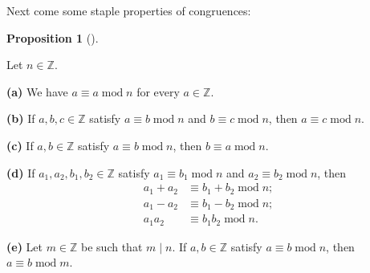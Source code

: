 \documentclass[numbers=enddot,12pt,final,onecolumn,notitlepage]{scrartcl}%
\numberwithin{exer}{subsection}
\theoremstyle{definition}
\newtheorem{prop}[theo]{Proposition}
\newenvironment{proposition}[1][]
{\begin{prop}[#1]\begin{leftbar}}
{\end{leftbar}\end{prop}}
\begin{document}
Next come some staple properties of congruences:

\begin{proposition}
\label{prop.ent.mod.basics}Let $n\in\mathbb{Z}$.

\textbf{(a)} We have $a\equiv a\operatorname{mod}n$ for every $a\in\mathbb{Z}$.

\textbf{(b)} If $a,b,c\in\mathbb{Z}$ satisfy $a\equiv b\operatorname{mod}n$
and $b\equiv c\operatorname{mod}n$, then $a\equiv c\operatorname{mod}n$.

\textbf{(c)} If $a,b\in\mathbb{Z}$ satisfy $a\equiv b\operatorname{mod}n$,
then $b\equiv a\operatorname{mod}n$.

\textbf{(d)} If $a_{1},a_{2},b_{1},b_{2}\in\mathbb{Z}$ satisfy $a_{1}\equiv
b_{1}\operatorname{mod}n$ and $a_{2}\equiv b_{2}\operatorname{mod}n$, then%
\begin{align}
a_{1}+a_{2}  &  \equiv b_{1}+b_{2}\operatorname{mod}%
n;\label{eq.prop.ent.mod.basics.d.1}\\
a_{1}-a_{2}  &  \equiv b_{1}-b_{2}\operatorname{mod}%
n;\label{eq.prop.ent.mod.basics.d.2}\\
a_{1}a_{2}  &  \equiv b_{1}b_{2}\operatorname{mod}n.
\label{eq.prop.ent.mod.basics.d.3}%
\end{align}


\textbf{(e)} Let $m\in\mathbb{Z}$ be such that $m\mid n$. If $a,b\in
\mathbb{Z}$ satisfy $a\equiv b\operatorname{mod}n$, then $a\equiv
b\operatorname{mod}m$.
\end{proposition}
\end{document}
